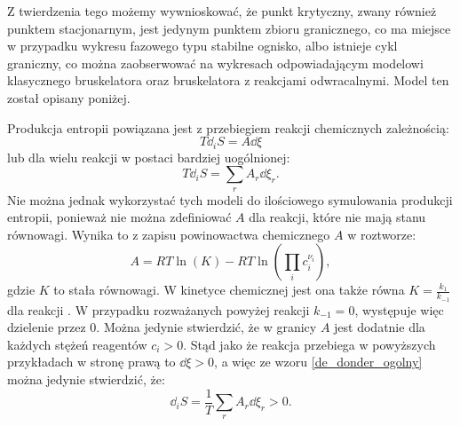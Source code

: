 \documentclass[10pt, a4paper, twoside, onecolumn]{article}
\numberwithin{equation}{section}
\begin{document}
	Z twierdzenia tego możemy wywnioskować, że punkt krytyczny, zwany również punktem stacjonarnym, jest jedynym punktem zbioru granicznego, co ma miejsce w przypadku wykresu fazowego typu stabilne ognisko, albo istnieje cykl graniczny, co można zaobserwować na wykresach odpowiadającym modelowi klasycznego bruskelatora oraz bruskelatora z reakcjami odwracalnymi. Model ten został opisany poniżej. \par
	Produkcja entropii powiązana jest z przebiegiem reakcji chemicznych zależnością:
	\begin{equation}\label{de_donder}
		T\dd_{i}S=A\dd{\xi}
	\end{equation}
	lub dla wielu reakcji w postaci bardziej uogólnionej: 
	\begin{equation}\label{de_donder_ogolny}
		T\dd_{i}S=\sum_{r}A_{r}\dd{\xi_{r}}.
	\end{equation}
	Nie można jednak wykorzystać tych modeli do ilościowego symulowania produkcji entropii, ponieważ nie można zdefiniować \(A\) dla reakcji, które nie mają stanu równowagi. Wynika to z zapisu powinowactwa chemicznego \(A\) w roztworze:
	\begin{equation}
		A = RT\ln(K) - RT\ln(\prod_{i}c_{i}^{\nu_{i}}), 
	\end{equation}
	gdzie \(K\) to stała równowagi. W kinetyce chemicznej jest ona także równa \(K = \frac{k_{1}}{k_{-1}}\) dla reakcji . W przypadku rozważanych powyżej reakcji \(k_{-1}=0\), występuje więc dzielenie przez \(0\). Można jedynie stwierdzić, że w granicy \(A\) jest dodatnie dla każdych stężeń reagentów \(c_{i}>0\). Stąd jako że reakcja przebiega w powyższych przykładach w stronę prawą to \(\dd{\xi}>0\), a więc ze wzoru \eqref{de_donder_ogolny} można jedynie stwierdzić, że:
	\begin{equation}
		\dd_{i}S=\frac{1}{T}\sum_{r}A_{r}\dd{\xi_{r}}>0.
	\end{equation}
	
\end{document}
